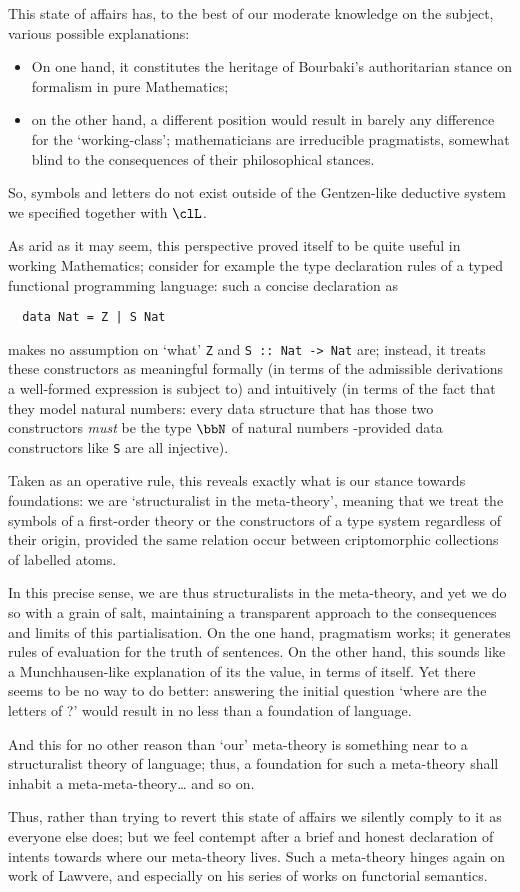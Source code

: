 This state of affairs has, to the best of our moderate knowledge on the subject, various possible explanations:
\begin{itemize}
	\item On one hand, it constitutes the heritage of Bourbaki's authoritarian stance on formalism in pure Mathematics;
	\item on the other hand, a different position would result in barely any difference for the `working-class'; mathematicians are irreducible pragmatists, somewhat blind to the consequences of their philosophical stances.
\end{itemize}
So, symbols and letters do not exist outside of the Gentzen-like deductive system we specified together with $\clL$.

As arid as it may seem, this perspective proved itself to be quite useful in working Mathematics; consider for example the type declaration rules of a typed functional programming language: such a concise declaration as
\begin{verbatim}
  data Nat = Z | S Nat
\end{verbatim}
makes no assumption on `what' \texttt{Z} and \texttt{S :: Nat -> Nat} are; instead, it treats these constructors as meaningful formally (in terms of the admissible derivations a well-formed expression is subject to) and intuitively (in terms of the fact that they model natural numbers: every data structure that has those two constructors \emph{must} be the type $\bbN$ of natural numbers -provided data constructors like \verb|S| are all injective).

Taken as an operative rule, this reveals exactly what is our stance towards foundations: we are `structuralist in the meta-theory', meaning that we treat the symbols of a first-order theory or the constructors of a type system regardless of their origin, provided the same relation occur between criptomorphic collections of labelled atoms.

In this precise sense, we are thus structuralists in the meta-theory, and yet we do so with a grain of salt, maintaining a transparent approach to the consequences and limits of this partialisation. On the one hand, pragmatism works; it generates rules of evaluation for the truth of sentences. On the other hand, this sounds like a Munchhausen-like explanation of its the value, in terms of itself. Yet there seems to be no way to do better: answering the initial question `where are the letters of ?' would result in no less than a foundation of language.

And this for no other reason than `our' meta-theory is something near to a structuralist theory of language; thus, a foundation for such a meta-theory shall inhabit a meta-meta-theory\dots{} and so on.

Thus, rather than trying to revert this state of affairs we silently comply to it as everyone else does; but we feel contempt after a brief and honest declaration of intents towards where our meta-theory lives. Such a meta-theory hinges again on work of Lawvere, and especially on his series of works on functorial semantics.
